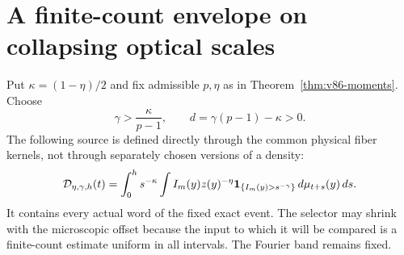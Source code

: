 \section{A finite-count envelope on collapsing optical scales}
\label{sec:v86-envelope}
Put $\kappa=(1-\eta)/2$ and fix admissible $p,\eta$ as in
Theorem~\ref{thm:v86-moments}. Choose
\begin{equation}\label{eq:v86-exponents}
 \gamma>\frac{\kappa}{p-1},\qquad d=\gamma(p-1)-\kappa>0.
\end{equation}
The following source is defined directly through the common physical
fiber kernels, not through separately chosen versions of a density:
\begin{equation}\label{eq:v86-large-source}
 \mathcal D_{\eta,\gamma,h}(t)
 =\int_0^h s^{-\kappa}
       \int I_m(y)z(y)^{-\eta}
                 \one_{\{I_m(y)>s^{-\gamma}\}}\,d\mu_{t+s}(y)\,ds.
\end{equation}
It contains every actual word of the fixed exact event. The selector
may shrink with the microscopic offset because the input to which it
will be compared is a finite-count estimate uniform in all intervals.
The Fourier band remains fixed.

